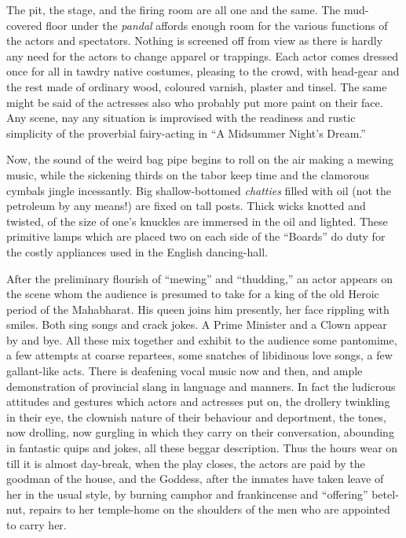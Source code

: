 \documentclass[a4paper, 12pt, oneside, english]{article}
\begin{document}
The pit, the stage, and the firing room are all one and the same. The mud-covered floor under the \emph{pandal} affords enough room for the various functions of the actors and spectators. Nothing is screened off from view as there is hardly any need for the actors to change apparel or trappings. Each actor comes dressed once for all in tawdry native costumes, pleasing to the crowd, with head-gear and the rest made of ordinary wood, coloured varnish, plaster and tinsel. The same might be said of the actresses also who probably put more paint on their face. Any scene, nay any situation is improvised with the readiness and rustic simplicity of the proverbial fairy-acting in ``A Midsummer Night's Dream.''

Now, the sound of the weird bag pipe begins to roll on the air making a mewing music, while the sickening thirds on the tabor keep time and the clamorous cymbals jingle incessantly. Big shallow-bottomed \emph{chatties} filled with oil (not the petroleum by any means!) are fixed on tall posts. Thick wicks knotted and twisted, of the size of one's knuckles are immersed in the oil and lighted. These primitive lamps which are placed two on each side of the ``Boards'' do duty for the costly appliances used in the English dancing-hall.

After the preliminary flourish of ``mewing'' and ``thudding,'' an actor appears on the scene whom the audience is presumed to take for a king of the old Heroic period of the Mahabharat. His queen joins him presently, her face rippling with smiles. Both sing songs and crack jokes. A Prime Minister and a Clown appear by and bye. All these mix together and exhibit to the audience some pantomime, a few attempts at coarse repartees, some snatches of libidinous love songs, a few gallant-like acts. There is deafening vocal music now and then, and ample demonstration of provincial slang in language and manners. In fact the ludicrous attitudes and gestures which actors and actresses put on, the drollery twinkling in their eye, the clownish nature of their behaviour and deportment, the tones, now drolling, now gurgling in which they carry on their conversation, abounding in fantastic quips and jokes, all these beggar description. Thus the hours wear on till it is almost day-break, when the play closes, the actors are paid by the goodman of the house, and the Goddess, after the inmates have taken leave of her in the usual style, by burning camphor and frankincense and ``offering'' betel-nut, repairs to her temple-home on the shoulders of the men who are appointed to carry her.
\end{document}
